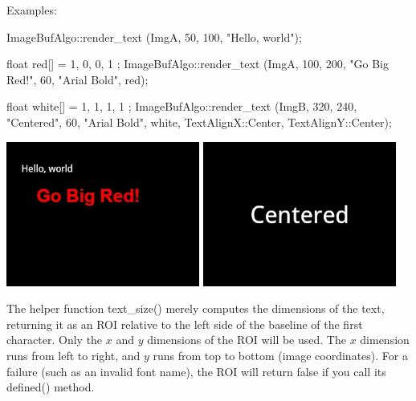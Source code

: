 \smallskip
\noindent Examples:
\begin{code}
    ImageBufAlgo::render_text (ImgA, 50, 100, "Hello, world");

    float red[] = { 1, 0, 0, 1 };
    ImageBufAlgo::render_text (ImgA, 100, 200, "Go Big Red!",
                               60, "Arial Bold", red);

    float white[] = { 1, 1, 1, 1 };
    ImageBufAlgo::render_text (ImgB, 320, 240, "Centered",
                               60, "Arial Bold", white,
                               TextAlignX::Center, TextAlignY::Center);

\end{code}
\spc \includegraphics[width=2.5in]{figures/text.jpg}
\spc \includegraphics[width=2.5in]{figures/textcentered.jpg} \\
\apiend


 

The helper function {\cf text_size()} merely computes the dimensions of the
text, returning it as an {\cf ROI}  relative to the left side of the
baseline of the first character. Only the $x$ and $y$ dimensions of the ROI
will be used. The $x$ dimension runs from left to right, and $y$ runs from
top to bottom (image coordinates). For a failure (such as an invalid
font name), the ROI will return {\cf false} if you call its {\cf defined()}
method.

